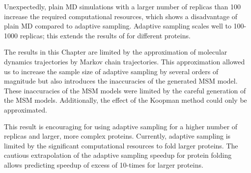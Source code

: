 Unexpectedly, plain MD simulations with a larger number of replicas than 100 increase the required computational resources, which shows a disadvantage of plain MD compared to adaptive sampling. Adaptive sampling scales well to 100-1000 replicas; this extends the results of \cite{bowman2010enhanced} for different proteins.  

The results in this Chapter are limited by the approximation of molecular dynamics trajectories by Markov chain trajectories. This approximation allowed us to increase the sample size of adaptive sampling by several orders of magnitude but also introduces the inaccuracies of the generated MSM model. These inaccuracies of the MSM models were limited by the careful generation of the MSM models. Additionally, the effect of the Koopman method could only be approximated.

This result is encouraging for using adaptive sampling for a higher number of replicas and larger, more complex proteins. Currently, adaptive sampling is limited by the significant computational resources to fold larger proteins. The cautious extrapolation of the adaptive sampling speedup for protein folding allows predicting speedup of excess of 10-times for larger proteins.












